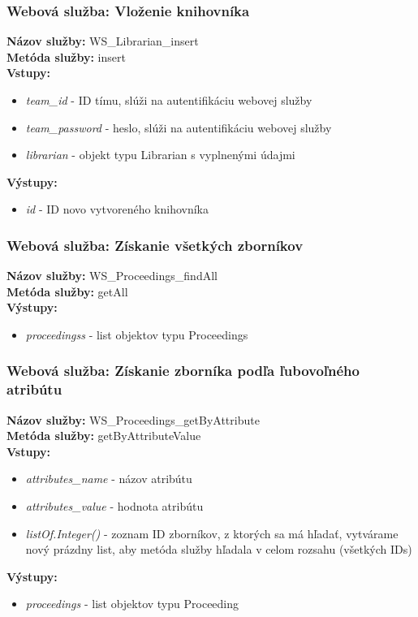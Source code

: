 \documentclass[10pt,oneside,slovak,a4paper]{article}
\begin{document}
\subsubsection{Webová služba: Vloženie knihovníka}
\textbf{Názov služby:} WS\_Librarian\_insert\\
\textbf{Metóda služby:} insert\\
\textbf{Vstupy:}
	\begin{itemize}
		\item \textit{team\_id} - ID tímu, slúži na autentifikáciu webovej služby
		\item \textit{team\_password} - heslo, slúži na autentifikáciu webovej služby
		\item \textit{librarian} - objekt typu Librarian s vyplnenými údajmi
	\end{itemize}
\textbf{Výstupy:}
	\begin{itemize}
		\item \textit{id} - ID novo vytvoreného knihovníka
	\end{itemize}
	
\subsubsection{Webová služba: Získanie všetkých zborníkov}
\textbf{Názov služby:} WS\_Proceedings\_findAll\\
\textbf{Metóda služby:} getAll\\
\textbf{Výstupy:}
	\begin{itemize}
		\item \textit{proceedingss} - list objektov typu Proceedings
	\end{itemize}
	
\subsubsection{Webová služba: Získanie zborníka podľa ľubovoľného atribútu}
\textbf{Názov služby:} WS\_Proceedings\_getByAttribute\\
\textbf{Metóda služby:} getByAttributeValue\\
\textbf{Vstupy:}
	\begin{itemize}
		\item \textit{attributes\_name} - názov atribútu
		\item \textit{attributes\_value} - hodnota atribútu
		\item \textit{listOf.Integer()} - zoznam ID zborníkov, z ktorých sa má hľadať, vytvárame nový prázdny list, aby metóda služby hľadala v celom rozsahu (všetkých IDs)
	\end{itemize}
\textbf{Výstupy:}
	\begin{itemize}
		\item \textit{proceedings} - list objektov typu Proceeding
	\end{itemize}
	
\end{document}

